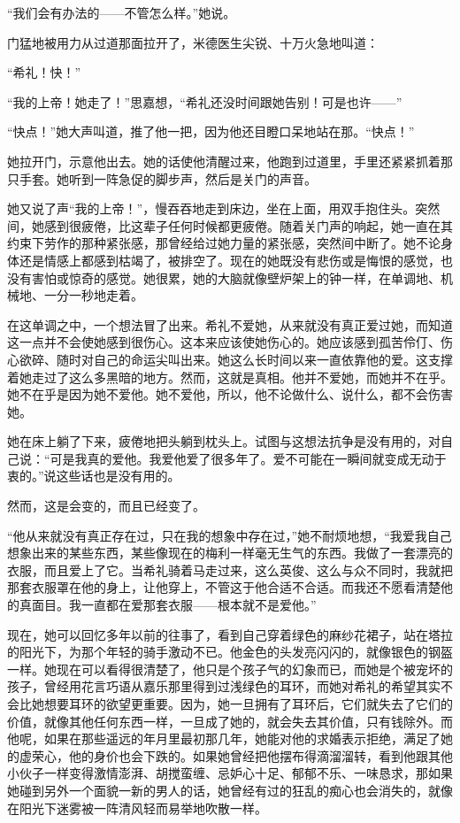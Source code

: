 \par “我们会有办法的——不管怎么样。”她说。
\par 门猛地被用力从过道那面拉开了，米德医生尖锐、十万火急地叫道：
\par “希礼！快！”
\par “我的上帝！她走了！”思嘉想，“希礼还没时间跟她告别！可是也许——”
\par “快点！”她大声叫道，推了他一把，因为他还目瞪口呆地站在那。“快点！”
\par 她拉开门，示意他出去。她的话使他清醒过来，他跑到过道里，手里还紧紧抓着那只手套。她听到一阵急促的脚步声，然后是关门的声音。
\par 她又说了声“我的上帝！”，慢吞吞地走到床边，坐在上面，用双手抱住头。突然间，她感到很疲倦，比这辈子任何时候都更疲倦。随着关门声的响起，她一直在其约束下劳作的那种紧张感，那曾经给过她力量的紧张感，突然间中断了。她不论身体还是情感上都感到枯竭了，被排空了。现在的她既没有悲伤或是悔恨的感觉，也没有害怕或惊奇的感觉。她很累，她的大脑就像壁炉架上的钟一样，在单调地、机械地、一分一秒地走着。
\par 在这单调之中，一个想法冒了出来。希礼不爱她，从来就没有真正爱过她，而知道这一点并不会使她感到很伤心。这本来应该使她伤心的。她应该感到孤苦伶仃、伤心欲碎、随时对自己的命运尖叫出来。她这么长时间以来一直依靠他的爱。这支撑着她走过了这么多黑暗的地方。然而，这就是真相。他并不爱她，而她并不在乎。她不在乎是因为她不爱他。她不爱他，所以，他不论做什么、说什么，都不会伤害她。
\par 她在床上躺了下来，疲倦地把头躺到枕头上。试图与这想法抗争是没有用的，对自己说：“可是我真的爱他。我爱他爱了很多年了。爱不可能在一瞬间就变成无动于衷的。”说这些话也是没有用的。
\par 然而，这是会变的，而且已经变了。
\par “他从来就没有真正存在过，只在我的想象中存在过，”她不耐烦地想，“我爱我自己想象出来的某些东西，某些像现在的梅利一样毫无生气的东西。我做了一套漂亮的衣服，而且爱上了它。当希礼骑着马走过来，这么英俊、这么与众不同时，我就把那套衣服罩在他的身上，让他穿上，不管这于他合适不合适。而我还不愿看清楚他的真面目。我一直都在爱那套衣服——根本就不是爱他。”
\par 现在，她可以回忆多年以前的往事了，看到自己穿着绿色的麻纱花裙子，站在塔拉的阳光下，为那个年轻的骑手激动不已。他金色的头发亮闪闪的，就像银色的钢盔一样。她现在可以看得很清楚了，他只是个孩子气的幻象而已，而她是个被宠坏的孩子，曾经用花言巧语从嘉乐那里得到过浅绿色的耳环，而她对希礼的希望其实不会比她想要耳环的欲望更重要。因为，她一旦拥有了耳环后，它们就失去了它们的价值，就像其他任何东西一样，一旦成了她的，就会失去其价值，只有钱除外。而他呢，如果在那些遥远的年月里最初那几年，她能对他的求婚表示拒绝，满足了她的虚荣心，他的身价也会下跌的。如果她曾经把他摆布得滴溜溜转，看到他跟其他小伙子一样变得激情澎湃、胡搅蛮缠、忌妒心十足、郁郁不乐、一味恳求，那如果她碰到另外一个面貌一新的男人的话，她曾经有过的狂乱的痴心也会消失的，就像在阳光下迷雾被一阵清风轻而易举地吹散一样。

